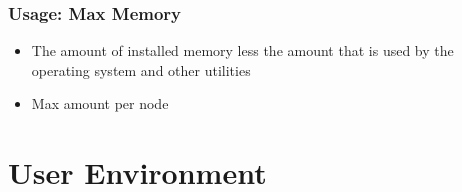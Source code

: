 \documentclass[slidestop,mathserif,compress,xcolor=svgnames,table]{beamer}
\newcommand*\vardiamond{\textcolor{tigerspurple}{%
  \ensuremath{\blacklozenge}}}
\begin{document}
\begin{frame}
\frametitle{\small Usage: Max Memory}
\begin{itemize}
\item The amount of installed memory less the amount that is used by the operating system and other utilities 
\item Max amount per node
\end{itemize}
\end{frame}


\section{User Environment}
\end{document}
